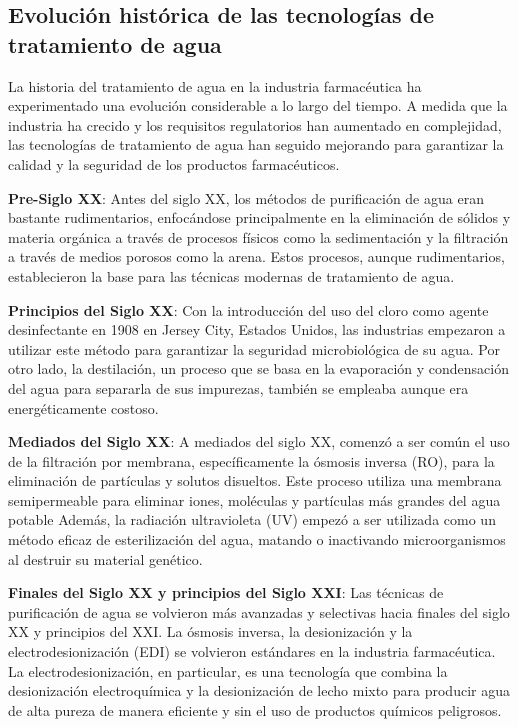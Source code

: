 \subsection{Evolución histórica de las tecnologías de tratamiento de agua}

La historia del tratamiento de agua en la industria farmacéutica ha experimentado una evolución considerable a lo largo del tiempo. A medida que la industria ha crecido y los requisitos regulatorios han aumentado en complejidad, las tecnologías de tratamiento de agua han seguido mejorando para garantizar la calidad y la seguridad de los productos farmacéuticos.

\textbf{Pre-Siglo XX}: Antes del siglo XX, los métodos de purificación de agua eran bastante rudimentarios, enfocándose principalmente en la eliminación de sólidos y materia orgánica a través de procesos físicos como la sedimentación y la filtración a través de medios porosos como la arena. Estos procesos, aunque rudimentarios, establecieron la base para las técnicas modernas de tratamiento de agua.

\textbf{Principios del Siglo XX}: Con la introducción del uso del cloro como agente desinfectante en 1908 en Jersey City, Estados Unidos, las industrias empezaron a utilizar este método para garantizar la seguridad microbiológica de su agua. Por otro lado, la destilación, un proceso que se basa en la evaporación y condensación del agua para separarla de sus impurezas, también se empleaba aunque era energéticamente costoso.

\textbf{Mediados del Siglo XX}: A mediados del siglo XX, comenzó a ser común el uso de la filtración por membrana, específicamente la ósmosis inversa (RO), para la eliminación de partículas y solutos disueltos. Este proceso utiliza una membrana semipermeable para eliminar iones, moléculas y partículas más grandes del agua potable Además, la radiación ultravioleta (UV) empezó a ser utilizada como un método eficaz de esterilización del agua, matando o inactivando microorganismos al destruir su material genético.

\textbf{Finales del Siglo XX y principios del Siglo XXI}: Las técnicas de purificación de agua se volvieron más avanzadas y selectivas hacia finales del siglo XX y principios del XXI. La ósmosis inversa, la desionización y la electrodesionización (EDI) se volvieron estándares en la industria farmacéutica. La electrodesionización, en particular, es una tecnología que combina la desionización electroquímica y la desionización de lecho mixto para producir agua de alta pureza de manera eficiente y sin el uso de productos químicos peligrosos.

